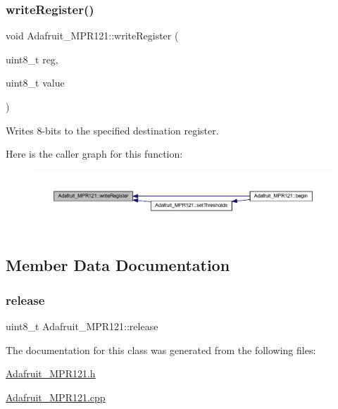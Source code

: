 \subsubsection{\texorpdfstring{write\+Register()}{writeRegister()}}
{\footnotesize\ttfamily void Adafruit\+\_\+\+M\+P\+R121\+::write\+Register (\begin{DoxyParamCaption}\item[{uint8\+\_\+t}]{reg,  }\item[{uint8\+\_\+t}]{value }\end{DoxyParamCaption})}



Writes 8-\/bits to the specified destination register. 

Here is the caller graph for this function\+:
\nopagebreak
\begin{figure}[H]
\begin{center}
\leavevmode
\includegraphics[width=350pt]{d9/d2e/class_adafruit___m_p_r121_a5dce866e817cfc15933e56b8dc679a13_icgraph}
\end{center}
\end{figure}


\subsection{Member Data Documentation}
\mbox{\label{class_adafruit___m_p_r121_aff6b909093cf5eca8217990625c860fe}} 
\subsubsection{\texorpdfstring{release}{release}}
{\footnotesize\ttfamily uint8\+\_\+t Adafruit\+\_\+\+M\+P\+R121\+::release}



The documentation for this class was generated from the following files\+:\begin{DoxyCompactItemize}
\item 
\hyperlink{_adafruit___m_p_r121_8h}{Adafruit\+\_\+\+M\+P\+R121.\+h}\item 
\hyperlink{_adafruit___m_p_r121_8cpp}{Adafruit\+\_\+\+M\+P\+R121.\+cpp}\end{DoxyCompactItemize}

